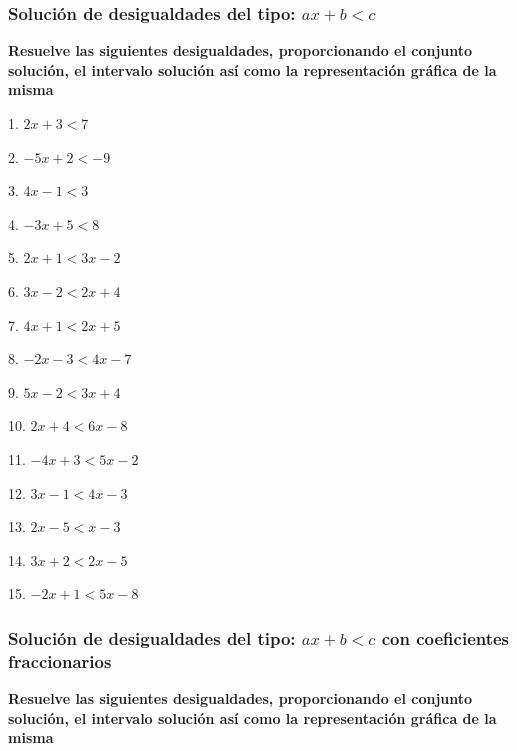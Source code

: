 \documentclass[12pt]{article}
\begin{document}
\subsubsection{\texorpdfstring{Solución de desigualdades del tipo:
\(ax+b<c\)}{Solución de desigualdades del tipo: ax+b\textless c}}\label{soluciuxf3n-de-desigualdades-del-tipo-axbc-1}
\textbf{Resuelve las siguientes desigualdades, proporcionando el
conjunto solución, el intervalo solución así como la representación
gráfica de la misma}

\begin{multicols}{2}

1. $2x+3<7$

2. $-5x+2<-9$

3. $4x-1<3$

4. $-3x+5<8$

5. $2x+1<3x-2$

6. $3x-2<2x+4$

7. $4x+1<2x+5$

8. $-2x-3<4x-7$

9. $5x-2<3x+4$

10. $2x+4<6x-8$

11. $-4x+3<5x-2$

12. $3x-1<4x-3$

13. $2x-5<x-3$

14. $3x+2<2x-5$

15. $-2x+1<5x-8$
\end{multicols}

\subsubsection{\texorpdfstring{Solución de desigualdades del tipo:
\(ax+b<c\) con coeficientes
fraccionarios}{Solución de desigualdades del tipo: ax+b\textless c con coeficientes fraccionarios}}\label{soluciuxf3n-de-desigualdades-del-tipo-axbc-con-coeficientes-fraccionarios-1}
\textbf{Resuelve las siguientes desigualdades, proporcionando el
conjunto solución, el intervalo solución así como la representación
gráfica de la misma}
\end{document}
